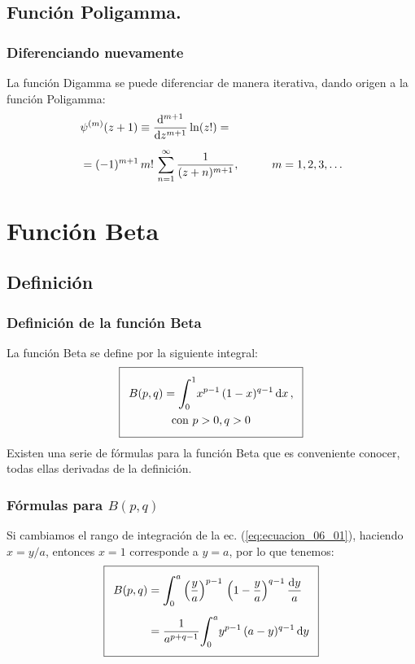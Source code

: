 \documentclass[12pt]{beamer}
\begin{document}
\subsection*{Función Poligamma.}

\begin{frame}
\frametitle{Diferenciando nuevamente}
La función Digamma se puede diferenciar de manera iterativa, dando origen a la función Poligamma:
\pause
\begin{align}
\begin{aligned}
&{\psi}^{(m)} (z + 1) \equiv \dv[m+1]{z} \ln(z!) = \\[0.5em]
&= (-1)^{m+1} \, m! \,\sum_{n=1}^{\infty} \dfrac{1}{(z + n)^{m+1}}, \hspace{1cm} m = 1, 2, 3, \ldots
\end{aligned}
\label{eq:ecuacion_10_41}
\end{align}
\end{frame}
\section{Función Beta}
\subsection{Definición}
\begin{frame}[fragile]
\frametitle{Definición de la función Beta}
La función Beta se define por la siguiente integral:
\begin{align} \addtolength{\fboxsep}{5pt}\boxed{
\begin{gathered}
B(p, q) = \scaleint{6ex}_{\bs 0}^{1} x^{p-1} \, (1- x )^{q-1} \dd{x}, \\
\mbox{con }  p > 0, q > 0
\end{gathered}
}
\label{eq:ecuacion_06_01}
\end{align}
\pause
Existen una serie de fórmulas para la función Beta que es conveniente conocer, todas ellas derivadas de la definición.
\end{frame}
\begin{frame}
\frametitle{Fórmulas para $B(p, q)$}
Si cambiamos el rango de integración de la ec. (\ref{eq:ecuacion_06_01}), haciendo $x = y/a$, entonces $x = 1$ corresponde a $y = a$, por lo que tenemos:
\begin{align} \addtolength{\fboxsep}{5pt}\boxed{
\begin{aligned}
B (p, q) &= \scaleint{6ex}_{\bs 0}^{a} \left( \dfrac{y}{a}\right)^{p-1} \, \left( 1 - \dfrac{y}{a}\right)^{q-1} \dfrac{\dd{y}}{a} \\[0.5em]
&= \dfrac{1}{a^{p+q-1}} \scaleint{6ex}_{\bs 0}^{a} y^{p-1} \, (a - y)^{q-1} \dd{y}
\end{aligned}
\label{eq:ecuacion_06_03}
}
\end{align}
\end{frame}
\end{document}
